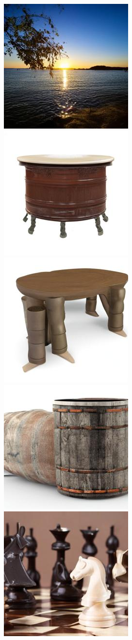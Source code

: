 \begin{figure}[h!]
\begin{subfigure}[t]{0.32\linewidth}
	\includegraphics[width=0.320\linewidth]{figs/samples_appendix_3/base_cfg_2_ode_prompt_69_image_3.jpg}\\ 
	\includegraphics[width=0.320\linewidth]{figs/samples_appendix_3/base_cfg_2_ode_prompt_73_image_1.jpg}\;%
	\includegraphics[width=0.320\linewidth]{figs/samples_appendix_3/base_cfg_2_ode_prompt_73_image_2.jpg}\;%
	\includegraphics[width=0.320\linewidth]{figs/samples_appendix_3/base_cfg_2_ode_prompt_73_image_3.jpg}\\ 
	\includegraphics[width=0.320\linewidth]{figs/samples_appendix_3/base_cfg_2_ode_prompt_75_image_1.jpg}\;%

\end{subfigure}
\end{figure}

